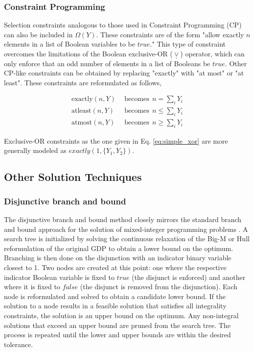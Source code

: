 \documentclass{juliacon}
\begin{document}
\subsubsection{Constraint Programming}
Selection constraints analogous to those used in Constraint Programming (CP) can also be included in $\Omega(Y)$. These constraints are of the form "allow exactly $n$ elements in a list of Boolean variables to be $true$." This type of constraint overcomes the limitations of the Boolean exclusive-OR ($\underline{\vee}$) operator, which can only enforce that an odd number of elements in a list of Booleans be $true$. Other CP-like constraints can be obtained by replacing "exactly" with "at most" or "at least". These constraints are reformulated as follows,

\begin{align*}
    \text{exactly}(n, Y) & \ \ \text{becomes} \ \ n = \sum_i Y_i \\
    \text{atleast}(n, Y) &  \ \ \text{becomes} \ \ n \leq \sum_i Y_i \\
    \text{atmost}(n, Y) &  \ \ \text{becomes} \ \ n \geq \sum_i Y_i
\end{align*}

Exclusive-OR constraints as the one given in Eq. \eqref{eq:simple_xor} are more generally modeled as $exactly(1,\{Y_1,Y_2\})$.

\subsection{Other Solution Techniques} \label{other_techniques}

\subsubsection{Disjunctive branch and bound}
The disjunctive branch and bound method closely mirrors the standard branch and bound approach for the solution of mixed-integer programming problems \cite{grossmann_lee_2003}. A search tree is initialized by solving the continuous relaxation of the Big-M or Hull reformulation of the original GDP to obtain a lower bound on the optimum. Branching is then done on the disjunction with an indicator binary variable closest to 1. Two nodes are created at this point: one where the respective indicator Boolean variable is fixed to $true$ (the disjunct is enforced) and another where it is fixed to $false$ (the disjunct is removed from the disjunction). Each node is reformulated and solved to obtain a candidate lower bound. If the solution to a node results in a feasible solution that satisfies all integrality constraints, the solution is an upper bound on the optimum. Any non-integral solutions that exceed an upper bound are pruned from the search tree. The process is repeated until the lower and upper bounds are within the desired tolerance.
\end{document}
